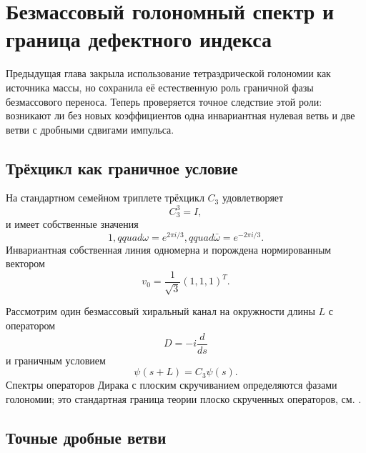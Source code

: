 \chapter{Безмассовый голономный спектр и граница дефектного индекса}

Предыдущая глава закрыла использование тетраэдрической голономии как
источника массы, но сохранила её естественную роль граничной фазы
безмассового переноса. Теперь проверяется точное следствие этой роли:
возникают ли без новых коэффициентов одна инвариантная нулевая ветвь и две
ветви с дробными сдвигами импульса.

\section{Трёхцикл как граничное условие}

На стандартном семейном триплете трёхцикл $C_3$ удовлетворяет
\begin{equation}
 C_3^3=I,
\end{equation}
и имеет собственные значения
\begin{equation}
 1,qquad \omega=e^{2\pi i/3},qquad \bar\omega=e^{-2\pi i/3}.
 \label{eq:v5-c3-eigenvalues}
\end{equation}
Инвариантная собственная линия одномерна и порождена нормированным
вектором
\begin{equation}
 v_0=\frac1{\sqrt3}(1,1,1)^T.
\end{equation}

Рассмотрим один безмассовый хиральный канал на окружности длины $L$ с
оператором
\begin{equation}
 D=-i\frac{d}{ds}
\end{equation}
и граничным условием
\begin{equation}
 \psi(s+L)=C_3\psi(s).
 \label{eq:v5-c3-boundary-condition}
\end{equation}
Спектры операторов Дирака с плоским скручиванием определяются фазами
голономии; это стандартная граница теории плоско скрученных операторов,
см. .

\section{Точные дробные ветви}

